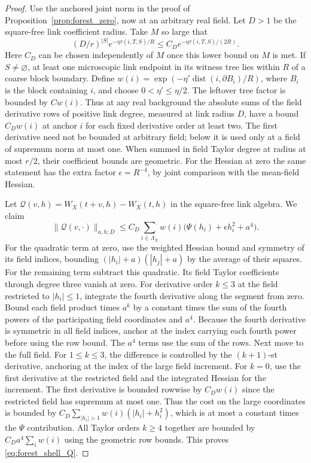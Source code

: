\documentclass[11pt]{article}
\begin{document}
\begin{proof}
Use the anchored joint norm in the proof of
Proposition~\ref{prop:forest_zero}, now at an arbitrary real
field. Let \(D>1\) be the square-free link coefficient radius.
Take \(M\) so large that
\[
 (D/r)^{|S|}e^{-\eta\tau(i,T,S)/R}
 \le C_D e^{-\eta\tau(i,T,S)/(2R)}.
\]
Here \(C_D\) can be chosen independently of \(M\) once this
lower bound on \(M\) is met. If \(S\ne\varnothing\), at least one
microscopic link endpoint in its witness tree lies within
\(R\) of a coarse block boundary. Define
\(w(i)=\exp(-\eta'\operatorname{dist}(i,\partial B_i)/R)\),
where \(B_i\) is the block containing \(i\), and choose
\(0<\eta'\le\eta/2\). The leftover tree factor is bounded by
\(Cw(i)\). Thus at any real background the absolute sums of the
field derivative rows of positive link degree, measured at link
radius \(D\), have a bound \(C_Dw(i)\) at anchor \(i\) for each
fixed derivative order at least two. The first derivative need not
be bounded at arbitrary field; below it is used only at a field
of supremum norm at most one. When summed in field Taylor degree at
radius at most \(r/2\), their coefficient bounds are geometric.
For the Hessian at zero the same statement has the extra factor
\(\epsilon=R^{-4}\), by joint comparison with the mean-field Hessian.

Let \(\mathcal Q(v,h)=W_X(t+v,h)-W_X(t,h)\) in the square-free
link algebra. We claim
\begin{equation}\label{eq:forest_shell_Q}
 \|\mathcal Q(v,\cdot)\|_{a,h;D}
 \le C_D\sum_{i\in\Lambda_X}w(i)
          \big(\Psi(h_i)+\epsilon h_i^2+a^4\big).
\end{equation}
For the quadratic term at zero, use the weighted Hessian
bound and symmetry of its field indices, bounding
\((|h_i|+a)(|h_j|+a)\) by the average of their squares.
For the remaining term subtract this quadratic. Its field
Taylor coefficients through degree three vanish at zero.
For derivative order \(k\le3\) at the field restricted to
\(|h_i|\le1\), integrate the fourth derivative along the
segment from zero. Bound each field product times \(a^k\)
by a constant times the sum of the fourth powers of the
participating field coordinates and \(a^4\). Because the
fourth derivative is symmetric in all field indices, anchor
at the index carrying each fourth power before using the row
bound. The \(a^4\) terms use the sum of the rows. Next move
to the full field. For \(1\le k\le3\), the difference is
controlled by the \((k+1)\)-st derivative, anchoring at the
index of the large field increment. For \(k=0\), use the
first derivative at the restricted field and the integrated
Hessian for the increment. The first derivative is bounded
rowwise by \(C_Dw(i)\) since the restricted field has supremum
at most one. Thus the cost on the large coordinates is bounded
by \(C_D\sum_{|h_i|>1}w(i)(|h_i|+h_i^2)\), which is at most a
constant times the \(\Psi\) contribution. All Taylor orders
\(k\ge4\) together are bounded by \(C_Da^4\sum_i w(i)\) using the
geometric row bounds. This proves \eqref{eq:forest_shell_Q}.


\end{proof}
\end{document}
